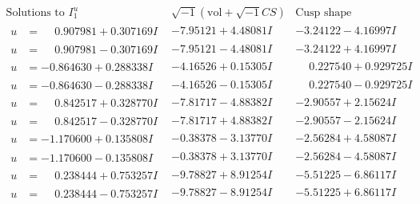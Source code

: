 \documentclass[1p]{elsarticle_modified}
\theoremstyle{definition}
\newcommand{\I}{\sqrt{-1}}
\begin{document}
$$\begin{array}{c|c|c}  
\text{Solutions to }I^u_{1}& \I (\text{vol} + \sqrt{-1}CS) & \text{Cusp shape}\\
 \hline 
\begin{aligned}
u &= \phantom{-}0.907981 + 0.307169 I\end{aligned}
 & -7.95121 + 4.48081 I & -3.24122 - 4.16997 I \\ \hline\begin{aligned}
u &= \phantom{-}0.907981 - 0.307169 I\end{aligned}
 & -7.95121 - 4.48081 I & -3.24122 + 4.16997 I \\ \hline\begin{aligned}
u &= -0.864630 + 0.288338 I\end{aligned}
 & -4.16526 + 0.15305 I & \phantom{-}0.227540 + 0.929725 I \\ \hline\begin{aligned}
u &= -0.864630 - 0.288338 I\end{aligned}
 & -4.16526 - 0.15305 I & \phantom{-}0.227540 - 0.929725 I \\ \hline\begin{aligned}
u &= \phantom{-}0.842517 + 0.328770 I\end{aligned}
 & -7.81717 - 4.88382 I & -2.90557 + 2.15624 I \\ \hline\begin{aligned}
u &= \phantom{-}0.842517 - 0.328770 I\end{aligned}
 & -7.81717 + 4.88382 I & -2.90557 - 2.15624 I \\ \hline\begin{aligned}
u &= -1.170600 + 0.135808 I\end{aligned}
 & -0.38378 - 3.13770 I & -2.56284 + 4.58087 I \\ \hline\begin{aligned}
u &= -1.170600 - 0.135808 I\end{aligned}
 & -0.38378 + 3.13770 I & -2.56284 - 4.58087 I \\ \hline\begin{aligned}
u &= \phantom{-}0.238444 + 0.753257 I\end{aligned}
 & -9.78827 + 8.91254 I & -5.51225 - 6.86117 I \\ \hline\begin{aligned}
u &= \phantom{-}0.238444 - 0.753257 I\end{aligned}
 & -9.78827 - 8.91254 I & -5.51225 + 6.86117 I \\ \hline\begin{aligned}

\end{aligned}
\end{array}$$
\end{document}
